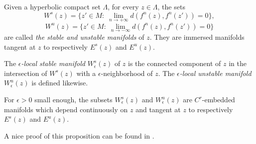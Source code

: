 \documentclass[11pt,openany,leqno]{article}
\begin{document}
Given a hyperbolic compact set $\Lambda$, for every $z\in \Lambda$, the sets 
\[W^s(z)= \{z'\in M:\; \lim_{ n\to+\infty} d(f^n(z),f^n(z'))= 0\},\]
\[W^u(z)= \{z'\in M:\; \lim_{ n\to-\infty} d(f^n(z),f^n(z'))= 0\}\]
are called \emph{the stable and unstable manifolds} of $z$. They are immersed manifolds tangent at $z$ to respectively $E^s(z)$ and $E^u(z)$.

The  \emph{$\epsilon$-local  stable manifold} $ W^s_\epsilon(z)$ of $z$ is the connected component of $z$ in the intersection of $W^s(z)$ with a $\epsilon$-neighborhood  of $z$. The \emph{$\epsilon$-local  unstable manifold} $ W^u_\epsilon(z)$ is defined likewise.

\begin{prop}
For $\epsilon>0$ small enough, the subsets  $ W^s_\epsilon(z)$ and $ W^u_\epsilon(z)$ are $C^r$-embedded manifolds which 
depend continuously on $z$ and tangent at $z$ to respectively  $E^s(z)$ and $E^u(z)$.
\end{prop}
A nice proof of this proposition can be found in \cite{Yoccozintro}.
%
%
%
%
\end{document}
